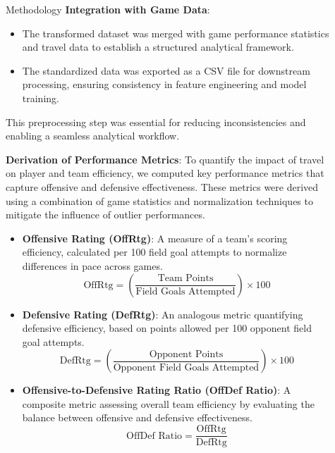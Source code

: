 \documentclass[final]{beamer}
\newlength{\sepwidth}
\newlength{\colwidth}
\newcommand{\separatorcolumn}{\begin{column}{\sepwidth}\end{column}}
\begin{document}
\begin{frame}[t]
\begin{columns}[t]
\begin{column}{\colwidth}
\begin{block}{Methodology}
\textbf{Integration with Game Data}:
\begin{itemize}
  \item The transformed dataset was merged with game performance statistics and travel data to establish a structured analytical framework.
  \item The standardized data was exported as a CSV file for downstream processing, ensuring consistency in feature engineering and model training.
\end{itemize}

This preprocessing step was essential for reducing inconsistencies and enabling a seamless analytical workflow.

\textbf{Derivation of Performance Metrics}: To quantify the impact of travel on player and team efficiency, we computed key performance metrics that capture offensive and defensive effectiveness. These metrics were derived using a combination of game statistics and normalization techniques to mitigate the influence of outlier performances.

\begin{itemize}
  \item \textbf{Offensive Rating (OffRtg)}: A measure of a team's scoring efficiency, calculated per 100 field goal attempts to normalize differences in pace across games. 
  $$ \text{OffRtg} = \left( \frac{\text{Team Points}}{\text{Field Goals Attempted}} \right) \times 100 $$

  \item \textbf{Defensive Rating (DefRtg)}: An analogous metric quantifying defensive efficiency, based on points allowed per 100 opponent field goal attempts. 
  $$ \text{DefRtg} = \left( \frac{\text{Opponent Points}}{\text{Opponent Field Goals Attempted}} \right) \times 100 $$

  \item \textbf{Offensive-to-Defensive Rating Ratio (OffDef Ratio)}: A composite metric assessing overall team efficiency by evaluating the balance between offensive and defensive effectiveness. 
  $$ \text{OffDef Ratio} = \frac{\text{OffRtg}}{\text{DefRtg}} $$
\end{itemize}



\end{block}



\end{column}

\separatorcolumn

\begin{column}{\colwidth}


\end{column}
\end{columns}
\end{frame}
\end{document}

